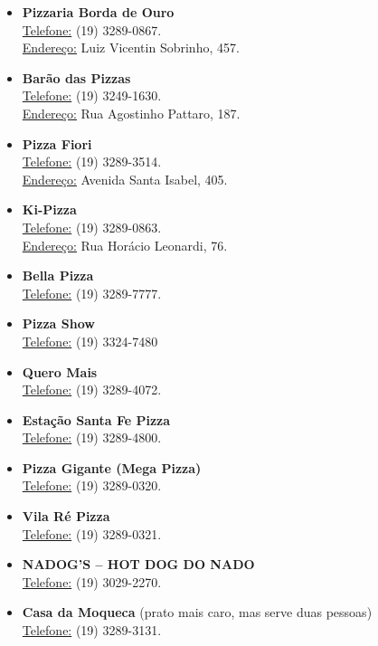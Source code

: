 \begin{itemize}
\item  \textbf{Pizzaria Borda de Ouro}
\\\underline{Telefone:} (19) 3289-0867.
\\\underline{Endereço:} Luiz Vicentin Sobrinho, 457.

\item  \textbf{Barão das Pizzas}
\\\underline{Telefone:} (19) 3249-1630.
\\\underline{Endereço:} Rua Agostinho Pattaro, 187.

\item  \textbf{Pizza Fiori}
\\\underline{Telefone:} (19) 3289-3514.
\\\underline{Endereço:} Avenida Santa Isabel, 405.

\item  \textbf{Ki-Pizza}
\\\underline{Telefone:} (19) 3289-0863.
\\\underline{Endereço:} Rua Horácio Leonardi, 76.

\item  \textbf{Bella Pizza}
\\\underline{Telefone:} (19) 3289-7777.

\item  \textbf{Pizza Show}
\\\underline{Telefone:} (19) 3324-7480

\item  \textbf{Quero Mais}
\\\underline{Telefone:} (19) 3289-4072.

\item  \textbf{Estação Santa Fe Pizza}
\\\underline{Telefone:} (19) 3289-4800.

\item  \textbf{Pizza Gigante (Mega Pizza)}
\\\underline{Telefone:} (19) 3289-0320.

\item  \textbf{Vila Ré Pizza}
\\\underline{Telefone:} (19) 3289-0321.

\item  \textbf{NADOG'S -- HOT DOG DO NADO}
\\\underline{Telefone:} (19) 3029-2270.

\item  \textbf{Casa da Moqueca} (prato mais caro, mas serve duas pessoas)
\\\underline{Telefone:} (19) 3289-3131.


\end{itemize}
